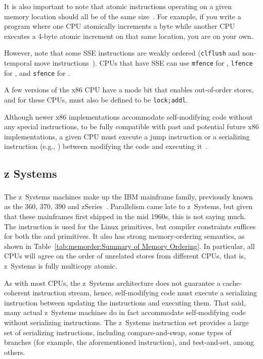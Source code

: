 It is also important to note that atomic instructions operating
on a given memory location should all be of the same
size~\cite[Section 8.1.2.2]{Intel64IA32v3A2011}.
For example, if you write a program where one CPU atomically increments
a byte while another CPU executes a 4-byte atomic increment on
that same location, you are on your own.

However, note that some SSE instructions are weakly ordered ({\tt clflush}
and non-temporal move instructions~\cite{IntelXeonV2b-96a}).
CPUs that have SSE can use {\tt mfence} for ,
{\tt lfence} for , and {\tt sfence} for .

A few versions of the x86 CPU have a mode bit that enables out-of-order
stores, and for these CPUs,  must also be defined to
be {\tt lock;addl}.

Although newer x86 implementations accommodate self-modifying code
without any special instructions, to be fully compatible with
past and potential future x86 implementations, a given CPU must
execute a jump instruction or a serializing instruction (e.g., )
between modifying the code and executing
it~\cite[Section 8.1.3]{Intel64IA32v3A2011}.

\subsection{z Systems}

The z~Systems machines make up the IBM\textsuperscript{\texttrademark}
mainframe family, previously
known as the 360, 370, 390 and zSeries~\cite{IBMzSeries04a}.
Parallelism came late to z~Systems, but given that these mainframes first
shipped in the mid 1960s, this is not saying much.
The  instruction is used for the Linux  primitives,
but compiler constraints suffices for both the
 and  primitives.
It also has strong memory-ordering semantics, as shown in
Table~\ref{tab:memorder:Summary of Memory Ordering}.
In particular, all CPUs
will agree on the order of unrelated stores from different CPUs,
that is, z~Systems is fully multicopy atomic.

As with most CPUs, the z~Systems architecture does not guarantee a
cache-coherent instruction stream, hence,
self-modifying code must execute a serializing instruction between updating
the instructions and executing them.
That said, many actual z~Systems machines do in fact accommodate self-modifying
code without serializing instructions.
The z~Systems instruction set provides a large set of serializing instructions,
including compare-and-swap, some types of branches (for example, the
aforementioned  instruction), and test-and-set,
among others.

